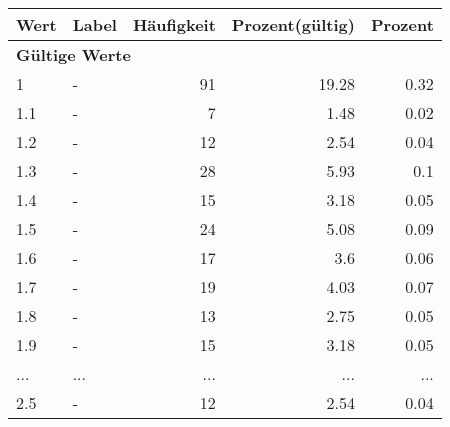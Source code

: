      \begin{longtable}{lXrrr}
     \toprule
     \textbf{Wert} & \textbf{Label} & \textbf{Häufigkeit} & \textbf{Prozent(gültig)} & \textbf{Prozent} \\
     \endhead
     \midrule
     \multicolumn{5}{l}{\textbf{Gültige Werte}}\\
        1 & \multicolumn{1}{X}{-} & %
          \num{91} &
          \num[round-mode=places,round-precision=2]{19,28} &
          \num[round-mode=places,round-precision=2]{0,32} \\
        1.1 & \multicolumn{1}{X}{-} & %
          \num{7} &
          \num[round-mode=places,round-precision=2]{1,48} &
          \num[round-mode=places,round-precision=2]{0,02} \\
        1.2 & \multicolumn{1}{X}{-} & %
          \num{12} &
          \num[round-mode=places,round-precision=2]{2,54} &
          \num[round-mode=places,round-precision=2]{0,04} \\
        1.3 & \multicolumn{1}{X}{-} & %
          \num{28} &
          \num[round-mode=places,round-precision=2]{5,93} &
          \num[round-mode=places,round-precision=2]{0,1} \\
        1.4 & \multicolumn{1}{X}{-} & %
          \num{15} &
          \num[round-mode=places,round-precision=2]{3,18} &
          \num[round-mode=places,round-precision=2]{0,05} \\
        1.5 & \multicolumn{1}{X}{-} & %
          \num{24} &
          \num[round-mode=places,round-precision=2]{5,08} &
          \num[round-mode=places,round-precision=2]{0,09} \\
        1.6 & \multicolumn{1}{X}{-} & %
          \num{17} &
          \num[round-mode=places,round-precision=2]{3,6} &
          \num[round-mode=places,round-precision=2]{0,06} \\
        1.7 & \multicolumn{1}{X}{-} & %
          \num{19} &
          \num[round-mode=places,round-precision=2]{4,03} &
          \num[round-mode=places,round-precision=2]{0,07} \\
        1.8 & \multicolumn{1}{X}{-} & %
          \num{13} &
          \num[round-mode=places,round-precision=2]{2,75} &
          \num[round-mode=places,round-precision=2]{0,05} \\
        1.9 & \multicolumn{1}{X}{-} & %
          \num{15} &
          \num[round-mode=places,round-precision=2]{3,18} &
          \num[round-mode=places,round-precision=2]{0,05} \\
       ... & ... & ... & ... & ... \\
        2.5 & \multicolumn{1}{X}{-} & %
          \num{12} &
          \num[round-mode=places,round-precision=2]{2,54} &
          \num[round-mode=places,round-precision=2]{0,04} \\


\end{longtable}
